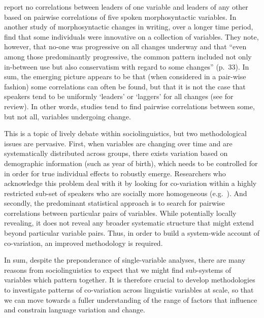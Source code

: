 \documentclass[review]{elsarticle} %
\begin{document}
\cite{waters2017one} report no correlations between leaders of one variable and leaders of any other based on pairwise correlations of five spoken morphosyntactic variables. In another study of morphosyntactic changes in writing, over a longer time period, \cite{nevalainen} find that some individuals were innovative on a collection of variables. They note, however, that no-one was progressive on all changes underway and that ``even among those predominantly progressive, the common pattern included not only in-between use but also conservatism with regard to some changes'' (p.\ 33).  In sum, the emerging picture appears to be that (when considered in a pair-wise fashion) some correlations can often be found, but that it is not the case that speakers tend to be uniformly `leaders' or `laggers' for all changes (see \citealt{tamminga2019interspeaker} for review). In other words, studies tend to find pairwise correlations between some, but not all, variables undergoing change.  

This is a topic of lively debate within sociolinguistics, but two methodological issues are pervasive.   First, when variables are changing over time and are systematically distributed across groups, there exists variation based on demographic information (such as year of birth), which needs to be controlled for in order for true individual effects to robustly emerge. Researchers who acknowledge this problem deal with it by looking for co-variation within a highly restricted sub-set of speakers who are socially more homogeneous (e.g.\ \cite{tamminga2019interspeaker}).  And secondly, the predominant statistical approach is to search for pairwise correlations between particular pairs of variables.  While potentially locally revealing, it does not reveal any broader systematic structure that might extend beyond particular variable pairs.  Thus, in order to build a system-wide account of co-variation, an improved methodology is required.

In sum, despite the preponderance of single-variable analyses, there are many reasons from sociolinguistics to expect that we might find sub-systems of variables which pattern together.   It is therefore crucial to develop methodologies to investigate patterns of co-variation across linguistic variables at scale, so that we can move towards a fuller understanding of the range of factors that influence and constrain language variation and change.
\end{document}
